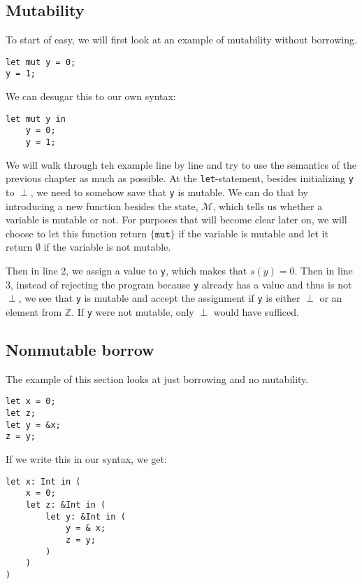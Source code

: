\subsection{Mutability}
To start of easy, we will first look at an example of mutability without borrowing. 

\begin{verbatim}
let mut y = 0;
y = 1;
\end{verbatim}

We can desugar this to our own syntax:

\begin{verbatim}
let mut y in 
    y = 0;
    y = 1;
\end{verbatim}

We will walk through teh example line by line and try to use the semantics of the previous chapter as much as possible. At the \texttt{let}-statement, besides initializing \texttt{y} to $\perp$, we need to somehow save that \texttt{y} is mutable. We can do that by introducing a new function besides the state, $\mathcal{M}$, which tells us whether a variable is mutable or not. For purposes that will become clear later on, we will choose to let this function return $\{\texttt{mut}\}$ if the variable is mutable and let it return $\emptyset$ if the variable is not mutable. 

Then in line 2, we assign a value to \texttt{y}, which makes that $s(y) = 0$. Then in line 3, instead of rejecting the program because \texttt{y} already has a value and thus is not $\perp$, we see that \texttt{y} is mutable and accept the assignment if \texttt{y} is either $\perp$ or an element from $\mathbb{Z}$. If \texttt{y} were not mutable, only $\perp$ would have sufficed. 

\subsection{Nonmutable borrow}
The example of this section looks at just borrowing and no mutability. 
\begin{verbatim}
let x = 0;
let z;
let y = &x;
z = y;
\end{verbatim}

If we write this in our syntax, we get: 

\begin{verbatim}
let x: Int in (
    x = 0;
    let z: &Int in (
        let y: &Int in (
            y = & x;
            z = y;
        )
    ) 
)
\end{verbatim} 

